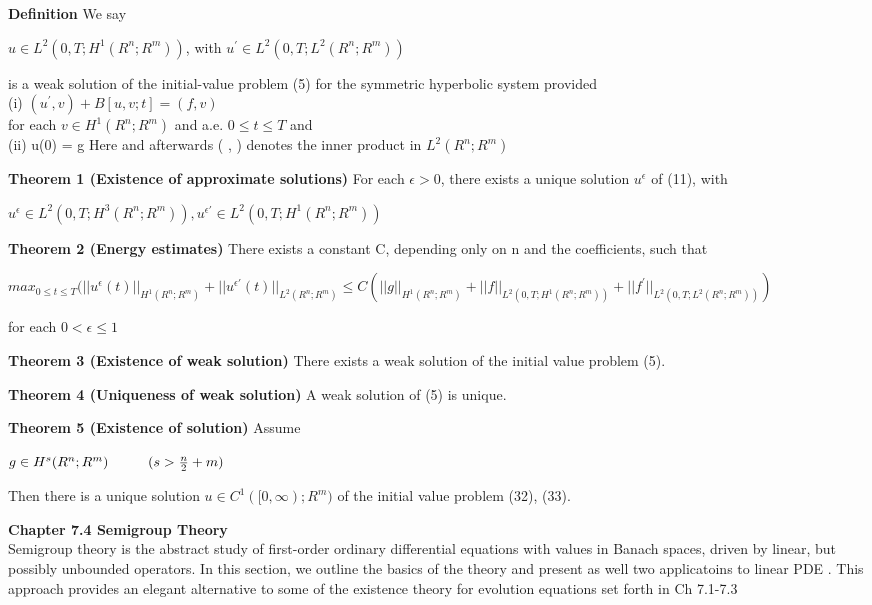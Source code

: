 \documentclass{article}
\newcommand\tab[1][1cm]{\hspace*{#1}}
\begin{document}
\textbf {Definition} We say
\begin{center}
$u \in L^2(0, T; H^{1}(R^n; R^m))$, with $u^{'} \in L^2 (0,T;L^2(R^n; R^m))$
\end{center}
is a weak solution of the initial-value problem (5) for the symmetric hyperbolic system provided \\
\tab (i) $(u^{'}, v) + B[u, v;t] = (f,v)$ \\
for each $v \in H^1(R^n; R^m)$ and a.e. $0 \leq t \leq T$ and \\
\tab (ii) u(0) = g
Here and afterwards ( , ) denotes the inner product in $L^2(R^n; R^m)$

\textbf {Theorem 1 (Existence of approximate solutions)} For each $\epsilon > 0$, there exists a unique solution $u^{\epsilon}$ of (11), with
\begin{center}
$u^{\epsilon} \in L^2(0, T; H^3(R^n;R^m)), u^{\epsilon '} \in L^2(0, T; H^1(R^n; R^m))$
\end{center}

\textbf {Theorem 2 (Energy estimates)} There exists a constant C, depending only on n and the coefficients, such that
\begin{center}
$max_{0 \leq t \leq T}(||u^{\epsilon}(t)||_{H^{1}(R^n;R^m)} + ||u^{\epsilon '}(t)||_{L^{2}(R^n;R^m)} \leq C(||g||_{H^{1}(R^n;R^m)} + ||f||_{L^{2} (0, T; H^{1}(R^n; R^m))} + ||f^{'}||_{L^{2}(0, T;L^{2}(R^n;R^m))})$
\end{center}
for each $0 < \epsilon \leq 1$

\textbf {Theorem 3 (Existence of weak solution)} There exists a weak solution of the initial value problem (5).

\textbf {Theorem 4 (Uniqueness of weak solution)} A weak solution of (5) is unique.

\textbf {Theorem 5 (Existence of solution)} Assume
\begin{center}
$g \in H^{s}(R^n; R^m) \tab (s > \frac{n}{2} + m)$
\end{center}
Then there is a unique solution $u \in C^1([0, \infty); R^m)$ of the initial value problem (32), (33).

\textbf {Chapter 7.4 Semigroup Theory} \\ Semigroup theory is the abstract study of first-order ordinary differential equations with values in Banach spaces, driven by linear, but possibly unbounded operators. In this section, we outline the basics of the theory and present as well two applicatoins to linear PDE . This approach provides an elegant alternative to some of the existence theory for evolution equations set forth in Ch 7.1-7.3
\end{document}
